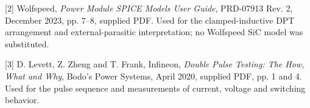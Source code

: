 \documentclass[10pt,a4paper]{article}
\begin{document}
[2] Wolfspeed, \emph{Power Module SPICE Models User Guide}, PRD-07913 Rev. 2, December 2023, pp. 7--8, supplied PDF. Used for the clamped-inductive DPT arrangement and external-parasitic interpretation; no Wolfspeed SiC model was substituted.

[3] D. Levett, Z. Zheng and T. Frank, Infineon, \emph{Double Pulse Testing: The How, What and Why}, Bodo's Power Systems, April 2020, supplied PDF, pp. 1 and 4. Used for the pulse sequence and measurements of current, voltage and switching behavior.
\end{document}
